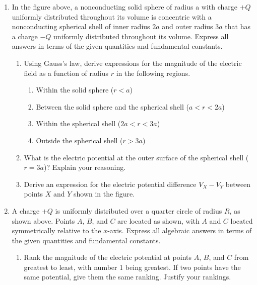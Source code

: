 \documentclass{../../../oss-classkick}
\begin{document}
\begin{multicols}{2}
\begin{enumerate}[leftmargin=18pt,resume]
  \end{enumerate}
\end{multicols}
\newpage


\genfreedirections

\begin{enumerate}
\item In the figure above, a nonconducting solid sphere of radius a with charge
  $+Q$ uniformly distributed throughout its volume is concentric with a
  nonconducting spherical shell of inner radius $2a$ and outer radius $3a$ that
  has a charge $-Q$ uniformly distributed throughout its volume. Express all
  answers in terms of the given quantities and fundamental constants.
  \begin{enumerate}
  \item Using Gauss's law, derive expressions for the magnitude of the
    electric field as a function of radius $r$ in the following regions.
    \begin{enumerate}
    \item Within the solid sphere ($r<a$)
    \item Between the solid sphere and the spherical shell ($a<r<2a$)
    \item Within the spherical shell ($2a<r<3a$)
    \item Outside the spherical shell ($r>3a$)
    \end{enumerate}
  \item What is the electric potential at the outer surface of the spherical
    shell ($r=3a$)? Explain your reasoning.
  \item Derive an expression for the electric potential difference $V_X-V_Y$
    between points $X$ and $Y$ shown in the figure.
  \end{enumerate}
  \newpage

\item A charge $+Q$ is uniformly distributed over a quarter circle of radius
  $R$, as shown above. Points $A$, $B$, and $C$ are located as shown, with $A$
  and $C$ located symmetrically relative to the $x$-axis. Express all algebraic
  answers in terms of the given quantities and fundamental constants.
  \begin{enumerate}
  \item Rank the magnitude of the electric potential at points $A$, $B$, and $C$
    from greatest to least, with number 1 being greatest. If two points have
    the same potential, give them the same ranking. Justify your rankings.


\end{enumerate}
\end{enumerate}
\end{document}

